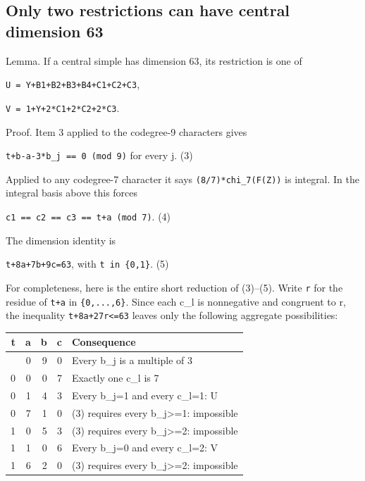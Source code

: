 \hypertarget{only-two-restrictions-can-have-central-dimension-63}{%
\subsection{Only two restrictions can have central dimension
63}\label{only-two-restrictions-can-have-central-dimension-63}}

Lemma. If a central simple has dimension 63, its restriction is one of

\texttt{U = Y+\allowbreak{}B1+B2+\allowbreak{}B3+B4+\allowbreak{}C1+C2+\allowbreak{}C3},

\texttt{V = 1+\allowbreak{}Y+2*C1\allowbreak{}+2*C2+\allowbreak{}2*C3}.

Proof. Item 3 applied to the codegree-9 characters gives

\texttt{t+b-\allowbreak{}a-\allowbreak{}3*b\_\allowbreak{}j == 0\allowbreak{} (mod \allowbreak{}9)}
for every j. (3)

Applied to any codegree-7 character it says
\texttt{(8/\allowbreak{}7)*chi\allowbreak{}\_\allowbreak{}7(F(Z)\allowbreak{})}
is integral. In the integral basis above this forces

\texttt{c1 == \allowbreak{}c2 == \allowbreak{}c3 == \allowbreak{}t+a (m\allowbreak{}od 7)}.
(4)

The dimension identity is

\texttt{t+8a+7\allowbreak{}b+9c=6\allowbreak{}3}, with
\texttt{t in \{\allowbreak{}0,1\}}. (5)

For completeness, here is the entire short reduction of (3)--(5). Write
\texttt{r} for the residue of \texttt{t+a} in
\texttt{\{0,.\allowbreak{}.\allowbreak{}.\allowbreak{},6\}}. Since each
c\_l is nonnegative and congruent to r, the inequality
\texttt{t+8a+2\allowbreak{}7r<=63\allowbreak{}} leaves only the
following aggregate possibilities:

\begin{longtable}[]{@{}rrrrl@{}}
\toprule\noalign{}
t & a & b & c & Consequence \\
\midrule\noalign{}
\endhead
\bottomrule\noalign{}
\endlastfoot
0 & 0 & 9 & 0 & Every b\_j is a multiple of 3 \\
0 & 0 & 0 & 7 & Exactly one c\_l is 7 \\
0 & 1 & 4 & 3 & Every b\_j=1 and every c\_l=1: U \\
0 & 7 & 1 & 0 & (3) requires every b\_j\textgreater=1: impossible \\
1 & 0 & 5 & 3 & (3) requires every b\_j\textgreater=2: impossible \\
1 & 1 & 0 & 6 & Every b\_j=0 and every c\_l=2: V \\
1 & 6 & 2 & 0 & (3) requires every b\_j\textgreater=2: impossible \\
\end{longtable}

